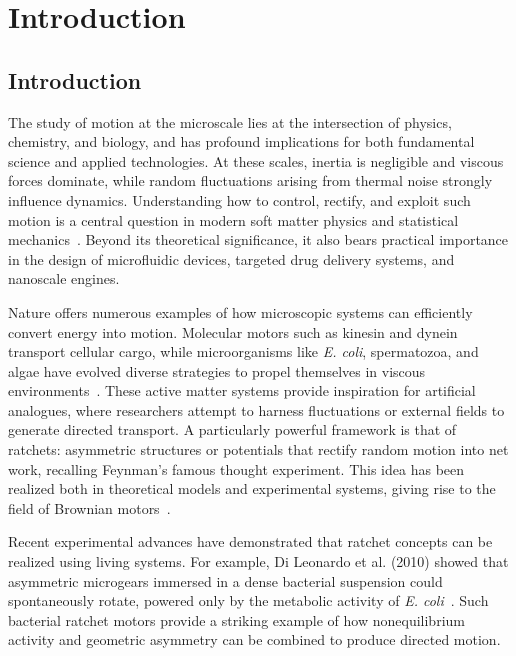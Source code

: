 


\part{Introduction}
\label{part:introduction}

\chapter{Introduction}
\label{ch:introduction}


The study of motion at the microscale lies at the intersection of physics, chemistry, and biology, and has profound implications for both fundamental science and applied technologies. At these scales, inertia is negligible and viscous forces dominate, while random fluctuations arising from thermal noise strongly influence dynamics. Understanding how to control, rectify, and exploit such motion is a central question in modern soft matter physics and statistical mechanics~\cite{purcell2014life, einstein1906theory}. Beyond its theoretical significance, it also bears practical importance in the design of microfluidic devices, targeted drug delivery systems, and nanoscale engines.

Nature offers numerous examples of how microscopic systems can efficiently convert energy into motion. Molecular motors such as kinesin and dynein transport cellular cargo, while microorganisms like \textit{E. coli}, spermatozoa, and algae have evolved diverse strategies to propel themselves in viscous environments~\cite{howard2002mechanics, vale2003molecular, marchetti2013hydrodynamics}. These active matter systems provide inspiration for artificial analogues, where researchers attempt to harness fluctuations or external fields to generate directed transport. A particularly powerful framework is that of ratchets: asymmetric structures or potentials that rectify random motion into net work, recalling Feynman’s famous thought experiment. This idea has been realized both in theoretical models and experimental systems, giving rise to the field of Brownian motors~\cite{julicher1997modeling, reimann2002brownian}.

Recent experimental advances have demonstrated that ratchet concepts can be realized using living systems. For example, Di Leonardo et al. (2010) showed that asymmetric microgears immersed in a dense bacterial suspension could spontaneously rotate, powered only by the metabolic activity of \textit{E. coli}~\cite{di2010bacterial}. Such bacterial ratchet motors provide a striking example of how nonequilibrium activity and geometric asymmetry can be combined to produce directed motion.

